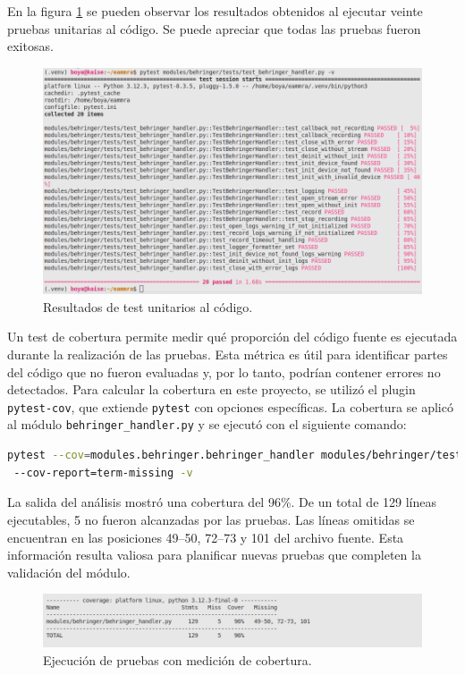 En la figura \ref{fig:testUni} se pueden observar los resultados obtenidos al ejecutar veinte pruebas unitarias al código.  Se puede apreciar que todas las pruebas fueron exitosas. 

\begin{figure}[htpb]
    \centering
    \includegraphics[width=\textwidth]{graficos/unittest.png}
    \caption{Resultados de test unitarios al código.}
    \label{fig:testUni}
\end{figure}

Un test de cobertura permite medir qué proporción del código fuente es ejecutada durante la realización de las pruebas. Esta métrica es útil para identificar partes del código que no fueron evaluadas y, por lo tanto, podrían contener errores no detectados. Para calcular la cobertura en este proyecto, se utilizó el plugin \texttt{pytest-cov}, que extiende \texttt{pytest} con opciones específicas. La cobertura se aplicó al módulo \texttt{behringer\_handler.py} y se ejecutó con el siguiente comando:

\begin{lstlisting}[language=bash] 
pytest --cov=modules.behringer.behringer_handler modules/behringer/tests/
 --cov-report=term-missing -v 
\end{lstlisting}

La salida del análisis mostró una cobertura del 96\%. De un total de 129 líneas ejecutables, 5 no fueron alcanzadas por las pruebas. Las líneas omitidas se encuentran en las posiciones 49–50, 72–73 y 101 del archivo fuente. Esta información resulta valiosa para planificar nuevas pruebas que completen la validación del módulo.

\begin{figure}[htpb]
    \centering
    \includegraphics[width=\textwidth]{graficos/coverage.png}
    \caption{Ejecución de pruebas con medición de cobertura.}
    \label{fig:testCov}
\end{figure}


